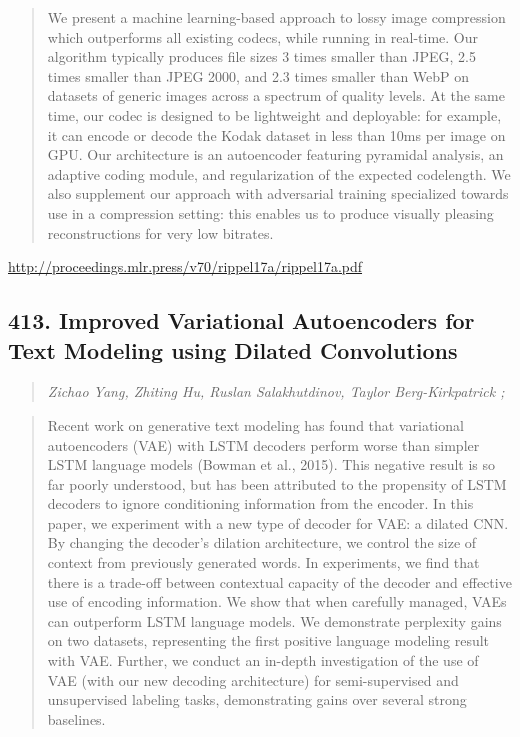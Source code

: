 \documentclass{article}
\begin{document}
\begin{quote}
    We present a machine learning-based approach to lossy image compression which outperforms all existing codecs, while running in real-time. Our algorithm typically produces file sizes 3 times smaller than JPEG, 2.5 times smaller than JPEG 2000, and 2.3 times smaller than WebP on datasets of generic images across a spectrum of quality levels. At the same time, our codec is designed to be lightweight and deployable: for example, it can encode or decode the Kodak dataset in less than 10ms per image on GPU. Our architecture is an autoencoder featuring pyramidal analysis, an adaptive coding module, and regularization of the expected codelength. We also supplement our approach with adversarial training specialized towards use in a compression setting: this enables us to produce visually pleasing reconstructions for very low bitrates.  \end{quote}

\href{http://proceedings.mlr.press/v70/rippel17a/rippel17a.pdf}{http://proceedings.mlr.press/v70/rippel17a/rippel17a.pdf}

\subsection{413. Improved Variational Autoencoders for Text Modeling using Dilated Convolutions}

\begin{quote}
\footnotesize{\textit{Zichao Yang, Zhiting Hu, Ruslan Salakhutdinov, Taylor Berg-Kirkpatrick ;}}
\end{quote}

\begin{quote}
    Recent work on generative text modeling has found that variational autoencoders (VAE) with LSTM decoders perform worse than simpler LSTM language models (Bowman et al., 2015). This negative result is so far poorly understood, but has been attributed to the propensity of LSTM decoders to ignore conditioning information from the encoder. In this paper, we experiment with a new type of decoder for VAE: a dilated CNN. By changing the decoder’s dilation architecture, we control the size of context from previously generated words. In experiments, we find that there is a trade-off between contextual capacity of the decoder and effective use of encoding information. We show that when carefully managed, VAEs can outperform LSTM language models. We demonstrate perplexity gains on two datasets, representing the first positive language modeling result with VAE. Further, we conduct an in-depth investigation of the use of VAE (with our new decoding architecture) for semi-supervised and unsupervised labeling tasks, demonstrating gains over several strong baselines.  \end{quote}
\end{document}
